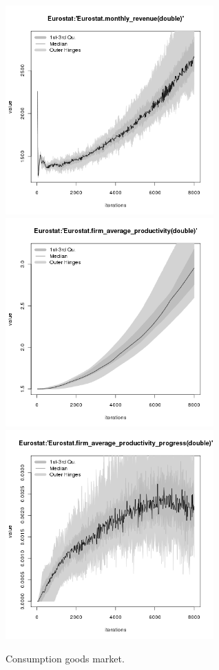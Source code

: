 \begin{figure}[H!]
\begin{minipage}{17cm}
\includegraphics[width=8cm]{./benchmark_plots/Eurostat-monthly_revenue.png}\\
\includegraphics[width=8cm]{./benchmark_plots/Eurostat-firm_average_productivity.png}
\includegraphics[width=8cm]{./benchmark_plots/Eurostat-firm_average_productivity_progress.png}
\end{minipage}
\caption{Consumption goods market.}
\label{Figure: Consumption Market}
\end{figure}
\clearpage


